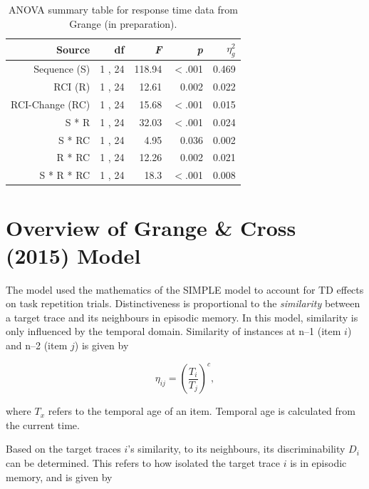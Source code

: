 \documentclass[a4paper, jou, natbib]{apa6}
\begin{document}
\begin{table}[htbp]
  \centering
  \caption{ANOVA summary table for response time data from Grange (in preparation).}
    \begin{tabular}{rrrrr}
    \toprule
    Source & df    & \emph{F}     & \emph{p}     & $\eta_{g}^{2}$ \\
    \midrule
    Sequence (S) & 1 , 24 & 118.94 & $<$.001 & 0.469 \\
    RCI (R) & 1 , 24 & 12.61 & 0.002 & 0.022 \\
    RCI-Change (RC) & 1 , 24 & 15.68 & $<$.001 & 0.015 \\
    S * R & 1 , 24 & 32.03 & $<$.001 & 0.024 \\
    S * RC & 1 , 24 & 4.95  & 0.036 & 0.002 \\
    R * RC & 1 , 24 & 12.26 & 0.002 & 0.021 \\
    S * R * RC & 1 , 24 & 18.3  & $<$.001 & 0.008 \\
    \bottomrule
    \end{tabular}%
  \label{tab:grangeData}%
\end{table}%



\appendix
\section{Overview of Grange \& Cross (2015) Model}
The \citet{Grange2015} model used the mathematics of the SIMPLE \cite{Brown2007} model to account for TD effects on task repetition trials. Distinctiveness is proportional to the \emph{similarity} between a target trace and its neighbours in episodic memory. In this model, similarity is only influenced by the temporal domain. Similarity of instances at n--1 (item $i$) and n--2 (item $j$) is given by

\begin{equation}
\eta_{ij} = \left(\frac{T_{i}}{T_{j}}\right)^{c}, 
\label{eq:simpleSimilarity}
\end{equation}

\noindent where $T_{x}$ refers to the temporal age of an item. Temporal age is calculated from the current time. 

Based on the target traces $i$'s similarity, to its neighbours, its discriminability $D_{i}$ can be determined. This refers to how isolated the target trace $i$ is in episodic memory, and is given by
\end{document}
